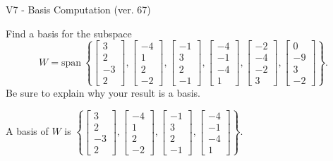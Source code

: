 \begin{exercise}
  \begin{exerciseTitle}V7 - Basis Computation (ver. 67)\end{exerciseTitle}
  \begin{exerciseStatement}
    Find a basis for the subspace 
\[W=\mathrm{span}\ \left\{\left[\begin{array}{r}
3 \\
2 \\
-3 \\
2
\end{array}\right] , \left[\begin{array}{r}
-4 \\
1 \\
2 \\
-2
\end{array}\right] , \left[\begin{array}{r}
-1 \\
3 \\
2 \\
-1
\end{array}\right] , \left[\begin{array}{r}
-4 \\
-1 \\
-4 \\
1
\end{array}\right] , \left[\begin{array}{r}
-2 \\
-4 \\
-2 \\
3
\end{array}\right] , \left[\begin{array}{r}
0 \\
-9 \\
3 \\
-2
\end{array}\right]\right\}.\]
 Be sure to explain why your result is a basis.


  \end{exerciseStatement}
  \begin{exerciseAnswer}
   A basis of \(W\) is  \(\left\{\left[\begin{array}{r}
3 \\
2 \\
-3 \\
2
\end{array}\right] , \left[\begin{array}{r}
-4 \\
1 \\
2 \\
-2
\end{array}\right] , \left[\begin{array}{r}
-1 \\
3 \\
2 \\
-1
\end{array}\right] , \left[\begin{array}{r}
-4 \\
-1 \\
-4 \\
1
\end{array}\right]\right\}\).
  


  \end{exerciseAnswer}
\end{exercise}